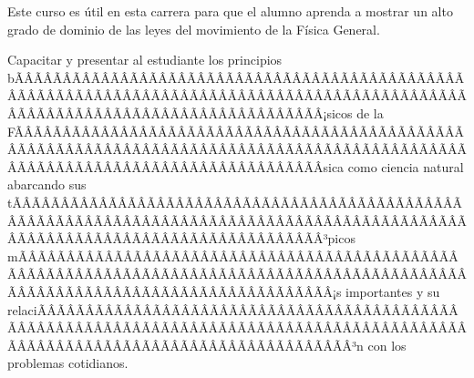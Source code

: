 \begin{sumilla}


\begin{fundamentacion}
Este curso es \'util en esta carrera para que el alumno aprenda a mostrar un alto grado de dominio de las leyes del movimiento de la F\'isica General.
\end{fundamentacion}

\begin{objetivosdelcurso}
\item Capacitar y presentar al estudiante los principios bÃÂÃÂÃÂÃÂÃÂÃÂÃÂÃÂÃÂÃÂÃÂÃÂÃÂÃÂÃÂÃÂÃÂÃÂÃÂÃÂÃÂÃÂÃÂÃÂÃÂÃÂÃÂÃÂÃÂÃÂÃÂÃÂÃÂÃÂÃÂÃÂÃÂÃÂÃÂÃÂÃÂÃÂÃÂÃÂÃÂÃÂÃÂÃÂÃÂÃÂÃÂÃÂÃÂÃÂÃÂÃÂÃÂÃÂÃÂÃÂÃÂÃÂÃÂÃÂ¡sicos de la FÃÂÃÂÃÂÃÂÃÂÃÂÃÂÃÂÃÂÃÂÃÂÃÂÃÂÃÂÃÂÃÂÃÂÃÂÃÂÃÂÃÂÃÂÃÂÃÂÃÂÃÂÃÂÃÂÃÂÃÂÃÂÃÂÃÂÃÂÃÂÃÂÃÂÃÂÃÂÃÂÃÂÃÂÃÂÃÂÃÂÃÂÃÂÃÂÃÂÃÂÃÂÃÂÃÂÃÂÃÂÃÂÃÂÃÂÃÂÃÂÃÂÃÂÃÂÃÂ­sica como ciencia natural abarcando sus tÃÂÃÂÃÂÃÂÃÂÃÂÃÂÃÂÃÂÃÂÃÂÃÂÃÂÃÂÃÂÃÂÃÂÃÂÃÂÃÂÃÂÃÂÃÂÃÂÃÂÃÂÃÂÃÂÃÂÃÂÃÂÃÂÃÂÃÂÃÂÃÂÃÂÃÂÃÂÃÂÃÂÃÂÃÂÃÂÃÂÃÂÃÂÃÂÃÂÃÂÃÂÃÂÃÂÃÂÃÂÃÂÃÂÃÂÃÂÃÂÃÂÃÂÃÂÃÂ³picos mÃÂÃÂÃÂÃÂÃÂÃÂÃÂÃÂÃÂÃÂÃÂÃÂÃÂÃÂÃÂÃÂÃÂÃÂÃÂÃÂÃÂÃÂÃÂÃÂÃÂÃÂÃÂÃÂÃÂÃÂÃÂÃÂÃÂÃÂÃÂÃÂÃÂÃÂÃÂÃÂÃÂÃÂÃÂÃÂÃÂÃÂÃÂÃÂÃÂÃÂÃÂÃÂÃÂÃÂÃÂÃÂÃÂÃÂÃÂÃÂÃÂÃÂÃÂÃÂ¡s importantes y su relaciÃÂÃÂÃÂÃÂÃÂÃÂÃÂÃÂÃÂÃÂÃÂÃÂÃÂÃÂÃÂÃÂÃÂÃÂÃÂÃÂÃÂÃÂÃÂÃÂÃÂÃÂÃÂÃÂÃÂÃÂÃÂÃÂÃÂÃÂÃÂÃÂÃÂÃÂÃÂÃÂÃÂÃÂÃÂÃÂÃÂÃÂÃÂÃÂÃÂÃÂÃÂÃÂÃÂÃÂÃÂÃÂÃÂÃÂÃÂÃÂÃÂÃÂÃÂÃÂ³n con los problemas cotidianos.
\end{objetivosdelcurso}

\begin{outcomes}
\end{outcomes}


\end{sumilla}
